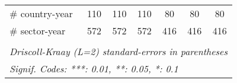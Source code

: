 \documentclass[a4paper]{article}
\begin{document}
\begin{table}[h!]
\begin{tabular}{lcccccc}
      \# country-year           & 110                   & 110                    & 110                    & 80                     & 80                     & 80\\  
      \# sector-year            & 572                   & 572                    & 572                    & 416                    & 416                    & 416\\  
     \bottomrule \\ [-0.9em]
      \multicolumn{7}{l}{\emph{Driscoll-Kraay (L=2) standard-errors in parentheses}}\\
      \multicolumn{7}{l}{\emph{Signif. Codes: ***: 0.01, **: 0.05, *: 0.1}}\\
   \end{tabular}
\end{table}
\FloatBarrier
\end{document}
